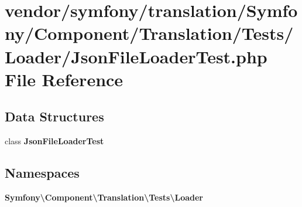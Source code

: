 \section{vendor/symfony/translation/\+Symfony/\+Component/\+Translation/\+Tests/\+Loader/\+Json\+File\+Loader\+Test.php File Reference}
\label{_json_file_loader_test_8php}
\subsection*{Data Structures}
\begin{DoxyCompactItemize}
\item 
class {\bf Json\+File\+Loader\+Test}
\end{DoxyCompactItemize}
\subsection*{Namespaces}
\begin{DoxyCompactItemize}
\item 
 {\bf Symfony\textbackslash{}\+Component\textbackslash{}\+Translation\textbackslash{}\+Tests\textbackslash{}\+Loader}
\end{DoxyCompactItemize}
